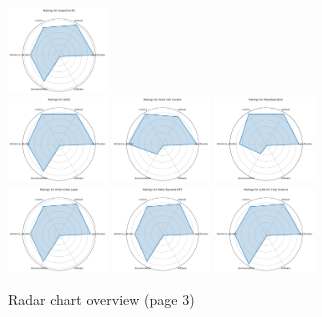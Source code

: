 \documentclass{article}
\begin{document}
\begin{figure}[ht!]
\includegraphics[width=0.2333\textwidth]{SuperCon3D_radar.pdf}
\\[1ex]
\includegraphics[width=0.2333\textwidth]{GeSS_radar.pdf}
\includegraphics[width=0.2333\textwidth]{Vocal Call Locator_radar.pdf}
\includegraphics[width=0.2333\textwidth]{MassSpecGym_radar.pdf}
\\[1ex]
\includegraphics[width=0.2333\textwidth]{Urban Data Layer_radar.pdf}
\includegraphics[width=0.2333\textwidth]{Delta Squared-DFT_radar.pdf}
\includegraphics[width=0.2333\textwidth]{LLMs for Crop Science_radar.pdf}
\\[1ex]
\caption{Radar chart overview (page 3)}
\end{figure}
\end{document}
